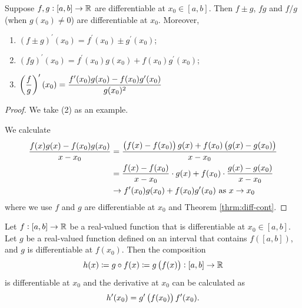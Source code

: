 \begin{theorem}
Suppose $f,g:[a,b]\to\mathbb R$ are differentiable at $x_0\in[a,b]$. Then $f\pm g$, $fg$ and $f/g$ (when $g(x_0)\neq0$) are differentiable at $x_0$. Moreover,
\begin{enumerate}[label=(\arabic*)]
\item $(f\pm g)^\prime(x_0)=f^\prime(x_0)\pm g^\prime(x_0)$;
\item $(fg)^\prime(x_0)=f^\prime(x_0)g(x_0)+f(x_0)g^\prime(x_0)$;
\item $\displaystyle\left(\frac{f}{g}\right)^\prime(x_0)=\frac{f^\prime(x_0)g(x_0)-f(x_0)g^\prime(x_0)}{g(x_0)^2}$
\end{enumerate}
\end{theorem}

\begin{proof}
We take (2) as an example.

We calculate
\begin{align*}
\frac{f(x)g(x)-f(x_0)g(x_0)}{x-x_0}&=\frac{\left(f(x)-f(x_0)\right)g(x)+f(x_0)\left(g(x)-g(x_0)\right)}{x-x_0}\\
&=\frac{f(x)-f(x_0)}{x-x_0}\cdot g(x)+f(x_0)\cdot\frac{g(x)-g(x_0)}{x-x_0}\\
&\to f^\prime(x_0)g(x_0)+f(x_0)g^\prime(x_0)\text{ as }x\to x_0
\end{align*}
where we use $f$ and $g$ are differentiable at $x_0$ and Theorem \ref{thrm:diff-cont}.
\end{proof}

\begin{theorem}
Let $f:[a,b]\to\mathbb R$ be a real-valued function that is differentiable at $x_0\in[a,b]$. Let $g$ be a real-valued function defined on an interval that contains $f([a,b])$, and $g$ is differentiable at $f(x_0)$. Then the composition
\[ h(x)\coloneqq g\circ f(x)\coloneqq g\left(f(x)\right):[a,b]\to\mathbb R \]
is differentiable at $x_0$ and the derivative at $x_0$ can be calculated as
\[ h^\prime(x_0)=g^\prime\left(f(x_0)\right)f^\prime(x_0). \]
\end{theorem}

